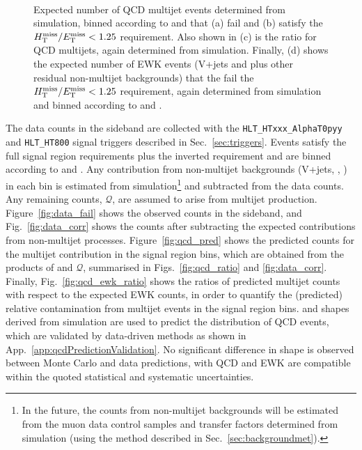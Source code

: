 \begin{figure}[!h]
{  } \\
  \caption{Expected number of QCD multijet events determined from
    simulation, binned according to \njet and \scalht that (a) fail
    and (b) satisfy the $\mbox{$\mbox{$H_{\rm T}^{\rm miss}$} / \mbox{$E_\text{T}^{\rm miss}$}$} < 1.25$ requirement. Also shown in
    (c) is the ratio \rmhtmet for QCD multijets, again determined from
    simulation. Finally, (d) shows the expected number of EWK events
    (V+jets and \ttbar plus other residual non-multijet backgrounds)
    that the fail the $\mbox{$\mbox{$H_{\rm T}^{\rm miss}$} / \mbox{$E_\text{T}^{\rm miss}$}$} < 1.25$ requirement, again determined
    from simulation and binned according to \njet and \scalht.}
  \label{fig:qcd_plots2}
\end{figure}

The data counts in the \mhtmet sideband are collected with the
\verb!HLT_HTxxx_AlphaT0pyy!  and \verb!HLT_HT800! signal triggers
described in Sec.~\ref{sec:triggers}. Events satisfy the full signal
region requirements plus the inverted \mhtmet requirement and are
binned according to \njet and \scalht. Any contribution from
non-multijet backgrounds (V+jets, \ttbar, \etc) in each bin is
estimated from simulation\footnote{In the future, the counts from
  non-multijet backgrounds will be estimated from the muon data
  control samples and transfer factors determined from simulation
  (using the method described in Sec.~\ref{sec:backgroundmet}).} and
subtracted from the data counts. Any remaining counts, $\mathcal{Q}$,
are assumed to arise from multijet production.
Figure~\ref{fig:data_fail} shows the observed counts in the \mhtmet
sideband, and Fig.~\ref{fig:data_corr} shows the counts after
subtracting the expected contributions from non-multijet processes.
Figure~\ref{fig:qcd_pred} shows the predicted counts for the multijet
contribution in the signal region bins, which are obtained from the
products of \rmhtmet and $\mathcal{Q}$, summarised in
Figs.~\ref{fig:qcd_ratio} and \ref{fig:data_corr}. Finally,
Fig.~\ref{fig:qcd_ewk_ratio} shows the ratios of predicted multijet
counts with respect to the expected EWK counts, in order to quantify
the (predicted) relative contamination from multijet events in the
signal region bins. \mht and \nb shapes derived from simulation are used to predict the distribution 
of QCD events, which are validated by data-driven methods as shown in App.~\ref{app:qcdPredictionValidation}. 
No significant difference in shape is observed between Monte Carlo and data predictions, 
with QCD and EWK are compatible within the quoted statistical and systematic uncertainties.



